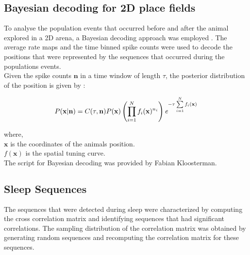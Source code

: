\subsection{Bayesian decoding for 2D place fields}
To analyse the population events that occurred before and after the animal explored in a 2D arena, a Bayesian decoding approach was employed \cite{Zhang2013}. The average rate maps and the time binned spike counts were used to decode the positions that were represented by the sequences that occurred during the populations events. \\
Given the spike counts $\mathbf{n}$ in a time window of length $\tau$, the posterior distribution of the position is given by : 

\[ 
P( \mathbf{x} | \mathbf{n}) = C(\tau, \mathbf{n}) P(\mathbf{x}) \left(\prod_{i = 1}^{N} f_{i}(\mathbf{x})^{n_i} \right) \emph{e}^{-\tau \sum\limits_{i = 1}^{N} f_{i}(\mathbf{x}) }
 \]

where, \\
$\mathbf{x}$ is the coordinates of the animals position.\\
$f(\mathbf{x})$ is the spatial tuning curve.\\
The script for Bayesian decoding was provided by Fabian Kloosterman.
	
\subsection{Sleep Sequences}
The sequences that were detected during sleep were characterized by computing the cross correlation matrix and identifying sequences that had significant correlations. The sampling distribution of the correlation matrix was obtained by generating random sequences and recomputing the correlation matrix for these sequences. 